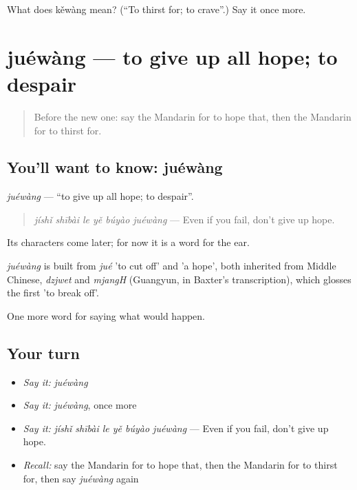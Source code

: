\begin{tcolorbox}[breakable,colback=teal!4,colframe=teal!35!black,title={Before you move on}]
What does kěwàng mean? (\textquotedblleft{}To thirst for; to crave\textquotedblright{}.) Say it once more.
\end{tcolorbox}
\section[juéwàng]{juéwàng — to give up all hope; to despair}

\label{lesson:ZH-C533-juewang}



\begin{quote}
Before the new one: say the Mandarin for to hope that, then the Mandarin for to thirst for.
\end{quote}

\subsection*{You'll want to know: juéwàng}
\emph{juéwàng} — \textquotedblleft{}to give up all hope; to despair\textquotedblright{}.

\begin{quote}
\emph{jíshǐ shībài le yě búyào juéwàng} — Even if you fail, don't give up hope.
\end{quote}

Its characters come later; for now it is a word for the ear.

\begin{cousinweb}
\emph{juéwàng} is built from \emph{jué} 'to cut off' and  'a hope', both inherited from Middle Chinese, \emph{dzjwet} and \emph{mjangH} (Guangyun, in Baxter's transcription), which glosses the first 'to break off'.
\end{cousinweb}

\begin{grammarlens}[title={What you've built}]
One more word for saying what would happen.
\end{grammarlens}

\subsection*{Your turn}
\begin{itemize}
\raggedright
  \item \emph{Say it:} \emph{juéwàng}
  \item \emph{Say it:} \emph{juéwàng}, once more
  \item \emph{Say it:} \emph{jíshǐ shībài le yě búyào juéwàng} — Even if you fail, don't give up hope.
  \item \emph{Recall:} say the Mandarin for to hope that, then the Mandarin for to thirst for, then say \emph{juéwàng} again
\end{itemize}

